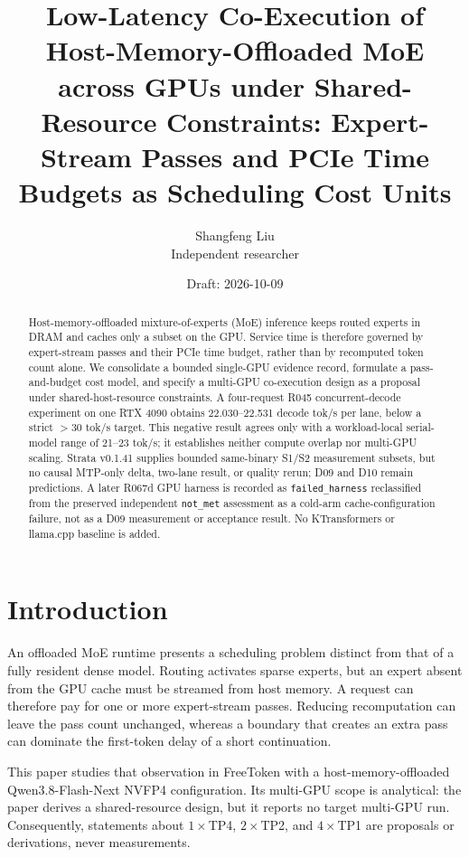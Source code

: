 \documentclass[11pt]{article}
\title{Low-Latency Co-Execution of Host-Memory-Offloaded MoE across GPUs under Shared-Resource Constraints: Expert-Stream Passes and PCIe Time Budgets as Scheduling Cost Units}
\author{Shangfeng Liu\\Independent researcher}
\date{Draft: 2026-10-09}
\begin{document}
\maketitle

\begin{abstract}
Host-memory-offloaded mixture-of-experts (MoE) inference keeps routed experts in DRAM and caches only a subset on the GPU. Service time is therefore governed by expert-stream passes and their PCIe time budget, rather than by recomputed token count alone. We consolidate a bounded single-GPU evidence record, formulate a pass-and-budget cost model, and specify a multi-GPU co-execution design as a proposal under shared-host-resource constraints. A four-request R045 concurrent-decode experiment on one RTX 4090 obtains 22.030--22.531 decode tok/s per lane, below a strict $>30$ tok/s target. This negative result agrees only with a workload-local serial-model range of 21--23 tok/s; it establishes neither compute overlap nor multi-GPU scaling. Strata v0.1.41 supplies bounded same-binary S1/S2 measurement subsets, but no causal MTP-only delta, two-lane result, or quality rerun; D09 and D10 remain predictions. A later R067d GPU harness is recorded as \texttt{failed\_harness} reclassified from the preserved independent \texttt{not\_met} assessment as a cold-arm cache-configuration failure, not as a D09 measurement or acceptance result. No KTransformers or llama.cpp baseline is added.
\end{abstract}

\section{Introduction}

An offloaded MoE runtime presents a scheduling problem distinct from that of a fully resident dense model. Routing activates sparse experts, but an expert absent from the GPU cache must be streamed from host memory. A request can therefore pay for one or more expert-stream passes. Reducing recomputation can leave the pass count unchanged, whereas a boundary that creates an extra pass can dominate the first-token delay of a short continuation.

This paper studies that observation in FreeToken with a host-memory-offloaded Qwen3.8-Flash-Next NVFP4 configuration. Its multi-GPU scope is analytical: the paper derives a shared-resource design, but it reports no target multi-GPU run. Consequently, statements about $1\times$TP4, $2\times$TP2, and $4\times$TP1 are proposals or derivations, never measurements.
\end{document}
